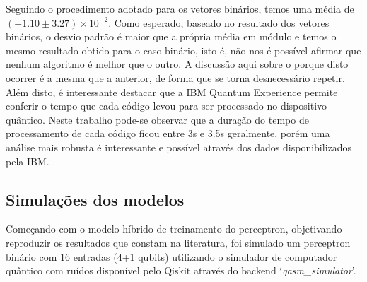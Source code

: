 \begin{table}[h!]
\caption{Discrepância para o produto interno entre vetores contínuos}
\label{tabela2}
\centering
{}
\end{table}

Seguindo o procedimento adotado para os vetores binários, temos uma média de $\left(-1.10\pm3.27\right)\times10^{-2}$. Como esperado, baseado no resultado dos vetores binários, o desvio padrão é maior que a própria média em módulo e temos o mesmo resultado obtido para o caso binário, isto é, não nos é possível  afirmar que nenhum algoritmo é melhor que o outro. A discussão aqui sobre o porque disto ocorrer é a mesma que a anterior, de  forma que se torna desnecessário repetir. Além disto, é interessante destacar que a IBM Quantum Experience permite conferir o tempo que cada código levou para ser processado no dispositivo quântico. Neste trabalho pode-se observar que a duração do tempo de processamento de cada  código ficou entre 3s e 3.5s geralmente, porém uma análise mais robusta é interessante e possível através dos dados disponibilizados pela IBM.

\subsection{Simulações dos modelos}

Começando com o modelo híbrido de treinamento do perceptron, objetivando reproduzir os resultados que constam na literatura,  foi simulado um perceptron binário com 16 entradas (4+1 qubits) utilizando o simulador de computador quântico com ruídos disponível pelo Qiskit através do backend `\textit{qasm\_simulator}'.

